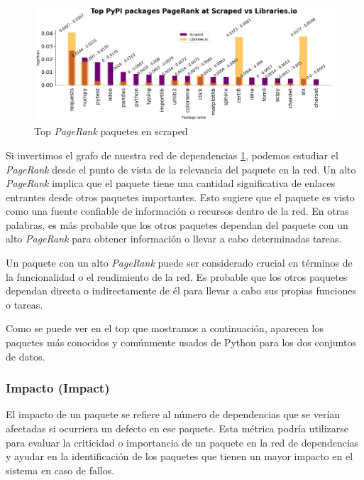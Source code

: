 \begin{figure}[h!]
    \begin{center}
        \includegraphics[width=1\textwidth]{img/pypi/t20_pkg_pr_scr.png}
        \caption{Top \textit{PageRank} paquetes en scraped}
        \label{fig:Top PageRank paquetes en scraped}
    \end{center}
\end{figure}

Si invertimos el grafo de nuestra red de dependencias \ref{fig:Top PageRank paquetes en scraped}, podemos estudiar el \textit{PageRank}
desde el punto de vista de la relevancia del paquete en la red. Un alto \textit{PageRank}
implica que el paquete tiene una cantidad significativa de enlaces entrantes desde otros paquetes
importantes. Esto sugiere que el paquete es visto como una fuente confiable de información o
recursos dentro de la red. En otras palabras, es más probable que los otros paquetes dependan
del paquete con un alto \textit{PageRank} para obtener información o llevar a cabo determinadas
tareas.

Un paquete con un alto \textit{PageRank} puede ser considerado crucial en términos de la funcionalidad
o el rendimiento de la red. Es probable que los otros paquetes dependan directa o indirectamente de
él para llevar a cabo sus propias funciones o tareas.

Como se puede ver en el top que mostramos a continuación, aparecen los paquetes más conocidos y
comúnmente usados de Python para los dos conjuntos de datos.

\subsubsection{Impacto (Impact)}

El impacto de un paquete se refiere al número de dependencias que se verían afectadas si
ocurriera un defecto en ese paquete. Esta métrica podría utilizarse para evaluar la criticidad
o importancia de un paquete en la red de dependencias y ayudar en la identificación de los
paquetes que tienen un mayor impacto en el sistema en caso de fallos.

